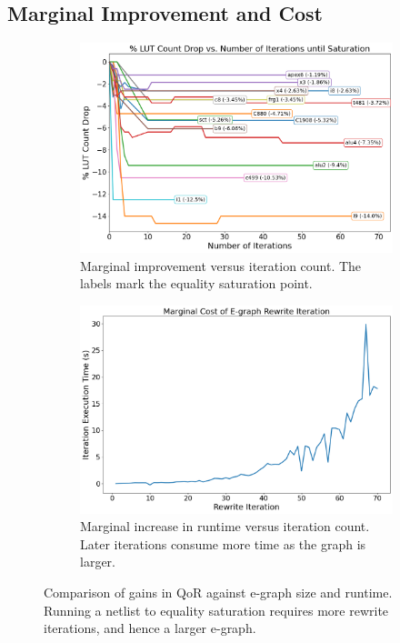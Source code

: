 \subsection{Marginal Improvement and Cost}\label{sec:results:margin}
\begin{figure}
    \begin{subfigure}{0.47\textwidth}
        \centering
        \includegraphics[width=\textwidth]{img/improvement.png}
        \caption{Marginal improvement versus iteration count. The labels mark the equality saturation point.}\label{fig:marginal:improvement}
        \Description[]{}
    \end{subfigure}
    \hfill\vspace{4mm}
    \begin{subfigure}{0.47\textwidth}
        \centering
        \includegraphics[width=\textwidth]{img/runtime_derivative.png}
        \caption{Marginal increase in runtime versus iteration count. Later iterations consume more time as the graph is larger.}\label{fig:marginal:runtime}
        \Description[]{}
    \end{subfigure}
    \caption{Comparison of gains in QoR against e-graph size and runtime. Running a netlist to equality saturation requires more rewrite iterations, and hence a larger e-graph.}\label{fig:marginal}
    \Description[]{}
\end{figure}

